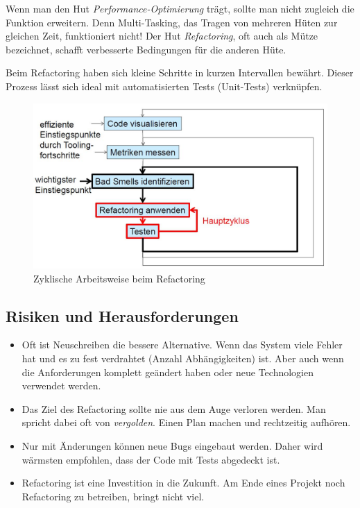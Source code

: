 Wenn man den Hut \textit{Performance-Optimierung} trägt, sollte man nicht zugleich die Funktion erweitern. Denn Multi-Tasking, das Tragen von mehreren Hüten zur gleichen Zeit, funktioniert nicht! Der Hut \textit{Refactoring}, oft auch als Mütze bezeichnet, schafft verbesserte Bedingungen für die anderen Hüte.

Beim Refactoring haben sich kleine Schritte in kurzen Intervallen bewährt. Dieser Prozess lässt sich ideal mit automatisierten Tests (Unit-Tests) verknüpfen.

\begin{figure}[h!]
	\centering
	\includegraphics[width=0.7\linewidth]{fig/zyklische-arbeitsweise-beim-refactoring}
	\caption{Zyklische Arbeitsweise beim Refactoring}
	\label{fig:zyklische-arbeitsweise-beim-refactoring}
\end{figure}

\subsection{Risiken und Herausforderungen}

\begin{itemize}
	\item Oft ist Neuschreiben die bessere Alternative. Wenn das System viele Fehler hat und es zu fest verdrahtet (Anzahl Abhängigkeiten) ist. Aber auch wenn die Anforderungen komplett geändert haben oder neue Technologien verwendet werden. 
	
	\item Das Ziel des Refactoring sollte nie aus dem Auge verloren werden. Man spricht dabei oft von \textit{vergolden}. Einen Plan machen und rechtzeitig aufhören.
	
	\item Nur mit Änderungen können neue Bugs eingebaut werden. Daher wird wärmsten empfohlen, dass der Code mit Tests abgedeckt ist.
	
	\item Refactoring ist eine Investition in die Zukunft. Am Ende eines Projekt noch Refactoring zu betreiben, bringt nicht viel.
\end{itemize}

